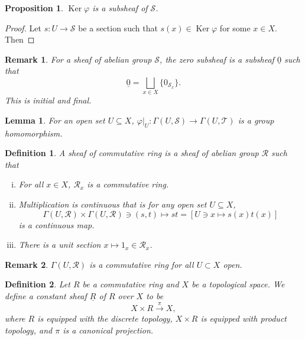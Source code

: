 \documentclass{article}
\newtheorem{proposition}{Proposition}[section]
\newtheorem{definition}{Definition}[section]
\newtheorem{lemma}{Lemma}[section]
\newtheorem{remark}{Remark}[section]
\DeclareMathOperator{\Ker}{Ker}
\begin{document}
\begin{proposition}
  $\Ker\varphi$ is a subsheaf of $\mathcal{S}$. 
\end{proposition}
\begin{proof}
  Let $s:U\to\mathcal{S}$ be a section such that $s(x)\in\Ker\varphi$ for some $x\in X$. Then %
\end{proof}

\begin{remark}
  For a sheaf of abelian group $\mathcal{S}$, the zero subsheaf is a subsheaf $\underline{0}$ such that 
  \begin{equation*}
    \underline{0} = \bigsqcup_{x\in X}\{0_{\mathcal{S}_x}\}.
  \end{equation*}
  This is initial and final.
\end{remark}

\begin{lemma}
  For an open set $U\subseteq X$, $\varphi|_U:\Gamma(U,\mathcal{S})\to\Gamma(U,\mathcal{T})$ is a group homomorphism.
\end{lemma}

\begin{definition}
  A sheaf of commutative ring is a sheaf of abelian group $\mathcal{R}$ such that 
  \begin{enumerate}[i).]
    \item For all $x\in X$, $\mathcal{R}_x$ is a commutative ring. 
    \item Multiplication is continuous that is for any open set $U\subseteq X$, 
    \begin{equation*}
      \Gamma(U,\mathcal{R})\times\Gamma(U,\mathcal{R})\ni(s,t)\mapsto st = [U\ni x\mapsto s(x)t(x)]
    \end{equation*}
    is a continuous map.
    \item There is a unit section $x\mapsto 1_x\in\mathcal{R}_x$.
  \end{enumerate}
\end{definition}

\begin{remark}
  $\Gamma(U,\mathcal{R})$ is a commutative ring for all $U\subset X$ open.
\end{remark}

\begin{definition}
  Let $R$ be a commutative ring and $X$ be a topological space. We define a constant sheaf $\underline{R}$ of $R$ over $X$ to be 
  \begin{equation*}
    X\times R\stackrel{\pi}{\to}X,
  \end{equation*}
  where $R$ is equipped with the discrete topology, $X\times R$ is equipped with product topology, and $\pi$ is a canonical projection.
\end{definition}
\end{document}
